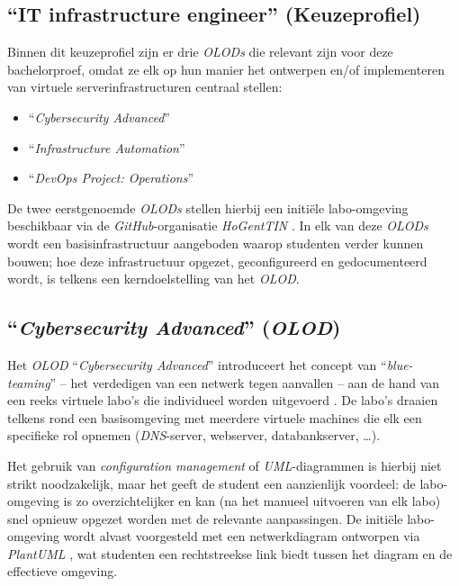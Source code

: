 \subsection{``IT infrastructure engineer'' (Keuzeprofiel)}%
\label{subsec:keuzeprofiel}

Binnen dit keuzeprofiel zijn er drie \emph{OLODs} die relevant zijn voor deze bachelorproef, omdat ze elk op hun manier het ontwerpen en/of implementeren van virtuele serverinfrastructuren centraal stellen:

\begin{itemize}
  \item ``\emph{Cybersecurity Advanced}'' \autocite{HOGENT2025}
  \item ``\emph{Infrastructure Automation}'' \autocite{HOGENT2025a}
  \item ``\emph{DevOps Project: Operations}'' \autocite{HOGENT2025b}
\end{itemize}

De twee eerstgenoemde \emph{OLODs} stellen hierbij een initiële labo-omgeving beschikbaar via de \emph{GitHub}-organisatie \emph{HoGentTIN} \autocite{HoGentTIN2025,HoGentTIN2025a}. In elk van deze \emph{OLODs} wordt een basisinfrastructuur aangeboden waarop studenten verder kunnen bouwen; hoe deze infrastructuur opgezet, geconfigureerd en gedocumenteerd wordt, is telkens een kerndoelstelling van het \emph{OLOD}.

\subsection{``\emph{Cybersecurity Advanced}'' (\emph{OLOD})}%
\label{subsec:cybersec_adv}

Het \emph{OLOD} ``\emph{Cybersecurity Advanced}'' introduceert het concept van ``\emph{blue-teaming}'' -- het verdedigen van een netwerk tegen aanvallen -- aan de hand van een reeks virtuele labo's die individueel worden uitgevoerd \autocite{HOGENT2025}. De labo's draaien telkens rond een basisomgeving met meerdere virtuele machines die elk een specifieke rol opnemen (\emph{DNS}-server, webserver, databankserver, \ldots).

Het gebruik van \emph{configuration management} of \emph{UML}-diagrammen is hierbij niet strikt noodzakelijk, maar het geeft de student een aanzienlijk voordeel: de labo-omgeving is zo overzichtelijker en kan (na het manueel uitvoeren van elk labo) snel opnieuw opgezet worden met de relevante aanpassingen. De initiële labo-omgeving wordt alvast voorgesteld met een netwerkdiagram ontworpen via \emph{PlantUML} \autocite{HoGentTIN2025}, wat studenten een rechtstreekse link biedt tussen het diagram en de effectieve omgeving.

